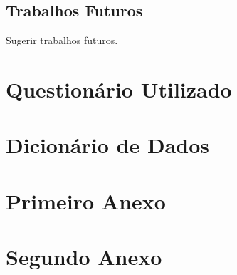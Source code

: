 \documentclass[
	12pt,				    %
	openright,			    %
	oneside,			    %
	a4paper,			    %
    sumario=tradicional,    %
	english,			    %
	brazil,				    %
	]{abntex2}
\begin{document}
\section{Trabalhos Futuros}

Sugerir trabalhos futuros.

\postextual

\printbibliography[title={REFERÊNCIAS}]


\begin{apendicesenv}
%
\partapendices
%
\chapter{Questionário Utilizado}
%
\chapter{Dicionário de Dados}
%
\end{apendicesenv}
%
%
\begin{anexosenv}
%
\partanexos
%
\chapter{Primeiro Anexo}
%
\chapter{Segundo Anexo}
%
\end{anexosenv}
\end{document}
